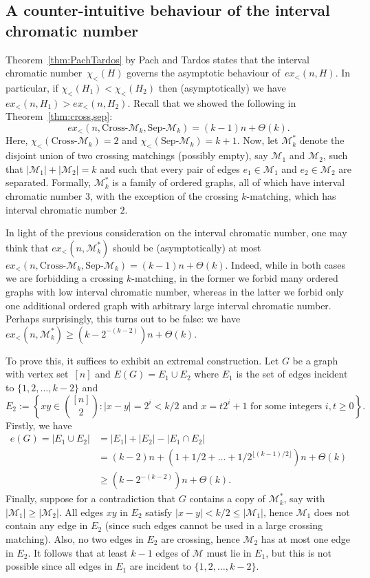 \documentclass[11pt]{article}
\theoremstyle{definition}
\begin{document}
\subsection{A counter-intuitive behaviour of the interval chromatic number}

Theorem~\ref{thm:PachTardos} by Pach and Tardos states that the interval chromatic number~$\chi_<(H)$ governs the asymptotic behaviour of~$ex_<(n,H)$.
In particular, if $\chi_<(H_1)<\chi_<(H_2)$ then (asymptotically) we have $ex_<(n,H_1)>ex_<(n,H_2)$.
Recall that we showed the following in Theorem~\ref{thm:cross,sep}:
$$ex_<(n,\text{Cross-}\mathcal M_k,\text{Sep-}\mathcal M_k)=(k-1)n+\Theta(k).$$
Here, $\chi_<(\text{Cross-}\mathcal M_k)=2$ and $\chi_<(\text{Sep-}\mathcal M_k)=k+1$.
Now, let $\mathcal M^*_k$ denote the disjoint union of two crossing matchings (possibly empty), say $\mathcal M_1$ and $\mathcal M_2$, such that $|\mathcal M_1|+|\mathcal M_2|=k$ and such that every pair of edges $e_1\in\mathcal M_1$ and $e_2\in\mathcal M_2$ are separated.
Formally, $\mathcal M^*_k$ is a family of ordered graphs, all of which have interval chromatic number $3$, with the exception of the crossing $k$-matching, which has interval chromatic number $2$.

In light of the previous consideration on the interval chromatic number, one may think that $ex_<(n,\mathcal M^*_k)$ should be (asymptotically) at most $ex_<(n,\text{Cross-}\mathcal M_k,\text{Sep-}\mathcal M_k)=(k-1)n+\Theta(k)$.
Indeed, while in both cases we are forbidding a crossing $k$-matching, in the former we forbid many ordered graphs with low interval chromatic number, whereas in the latter we forbid only one additional ordered graph with arbitrary large interval chromatic number.
Perhaps surprisingly, this turns out to be false: we have $ex_<(n,\mathcal M^*_k)\ge\left(k-2^{-(k-2)}\right)n + \Theta(k)$.

To prove this, it suffices to exhibit an extremal construction.
Let $G$ be a graph with vertex set~$[n]$ and $E(G)=E_1\cup E_2$ where $E_1$ is the set of edges incident to $\{1,2,\dots,k-2\}$ and
$$E_2:=\left\{xy\in\binom{[n]}{2}:|x-y|=2^i<k/2 \text{ and } x=t2^i+1 \text{ for some integers $i,t\ge 0$}\right\}.$$
Firstly, we have 
\begin{align*}
e(G)=|E_1\cup E_2|&=|E_1|+|E_2|-|E_1\cap E_2|\\
&=(k-2)n +(1+1/2+\dots+1/2^{\lfloor(k-1)/2\rfloor})n+\Theta(k) \\
&\ge\left(k-2^{-(k-2)}\right)n + \Theta(k).
\end{align*}
Finally, suppose for a contradiction that $G$ contains a copy of $\mathcal M^*_k$, say with $|\mathcal M_1|\ge |\mathcal M_2|$.
All edges $xy$ in $E_2$ satisfy $|x-y|<k/2\le|\mathcal M_1|$, hence $\mathcal M_1$ does not contain any edge in $E_2$ (since such edges cannot be used in a large crossing matching).
Also, no two edges in $E_2$ are crossing, hence $\mathcal M_2$ has at most one edge in $E_2$.
It follows that at least $k-1$ edges of $\mathcal M$ must lie in $E_1$, but this is not possible since all edges in $E_1$ are incident to $\{1,2,\dots,k-2\}$.
\end{document}
